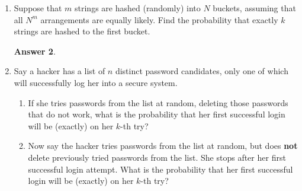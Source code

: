 \documentclass[12pt]{article}
\renewcommand{\(}{\left(}
\renewcommand{\)}{\right)}
\theoremstyle{definition}
\newtheorem*{answer}{Answer}
\begin{document}
\begin{enumerate}
\begin{enumerate}[label=\alph*.]
    \item If the integers 1 through $n$ are inserted in arbitrary order into a BST (where each possible order is equally likely), what is the probability (as an expression in terms of $n$) that the resulting BST will have completely degenerate structure?
    \item Using your expression from part (a), determine the smallest value of $n$ for which the probability of forming a completely degenerate BST is less than 0.001 (i.e., 0.1\%).

    \end{enumerate}

    \begin{shaded}
    \begin{answer}

    \end{answer}
    \end{shaded}
    \newpage


\item Suppose that $m$ strings are hashed (randomly) into $N$ buckets, assuming that all $N^m$ arrangements are equally likely.  Find the probability that exactly $k$ strings are hashed to the first bucket.

    \begin{shaded}
    \begin{answer}

    \end{answer}
    \end{shaded}
    \newpage


\item Say a hacker has a list of $n$ distinct password candidates, only one of which will successfully log her into a secure system.
    \begin{enumerate}[label=\alph*.]

    \item If she tries passwords from the list at random, deleting those passwords that do not work, what is the probability that her first successful login will be (exactly) on her $k$-th try?
    \item Now say the hacker tries passwords from the list at random, but does \textbf{not} delete previously tried passwords from the list. She stops after her first successful login attempt.  What is the probability that her first successful login will be (exactly) on her $k$-th try?

    \end{enumerate}


\end{enumerate}
\end{document}
